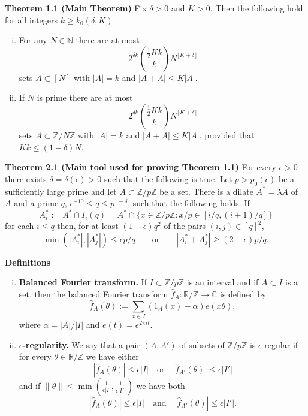 \documentclass[12pt]{article}
\theoremstyle{definition}
\newcommand{\naturals}{\mathbb{N}}
\newcommand{\integers}{\mathbb{Z}}
\newcommand{\complex}{\mathbb{C}}
\newcommand{\reals}{\mathbb{R}}
\begin{document}

\noindent \textbf{Theorem 1.1 (Main Theorem)}
Fix $\delta>0$ and $K>0$. Then the following hold for all integers $k \geq k_0(\delta, K)$.
\begin{enumerate}[(i)]
	\item For any $N\in \naturals$ there are at most
	\[
		2^{\delta k}\binom{\frac{1}{2}Kk}{k}N^{\lfloor K+\delta\rfloor}
	\]
	sets $A\subset [N]$ with $|A| = k$ and $|A+A|\leq K|A|$.

	\item If $N$ is prime there are at most
	\[
		2^{\delta k}\binom{\frac{1}{2}Kk}{k}N^{\lfloor K+\delta \rfloor}
	\]
	sets $A\subset \integers/N\integers$ with $|A|=k$ and $|A+A|\leq K|A|$, provided that $Kk\leq (1-\delta)N$.
\end{enumerate}

\vfill

\noindent \textbf{Theorem 2.1 (Main tool used for proving Theorem 1.1)}
For every $\epsilon>0$ there exists $\delta = \delta(\epsilon) > 0$ such that the following is true.
Let $p > p_0(\epsilon)$ be a sufficiently large prime and let $A \subset \integers/p\integers$ be a set.
There is a dilate $A^* = \lambda A$ of $A$ and a prime $q$, $\epsilon^{-10} \leq q \leq p^{1-\delta}$, such that the following holds. If
\[
A^*_i := A^*\cap I_i(q) = A^*\cap \{x\in \integers/p\integers: x/p\in [i/q, (i+1)/q]\}
\]
for each $i\leq q$ then, for at least $(1-\epsilon)q^2$ of the pairs $(i,j)\in [q]^2$,
\[
\min(|A^*_i|, |A^*_j|)\leq \epsilon p/q \qquad \text{or}\qquad |A^*_i+A^*_j|\geq (2-\epsilon)p/q.
\]

\vfill

\noindent\textbf{Definitions}
\begin{enumerate}[(i)]
	\item \textbf{Balanced Fourier transform.} If $I\subset \integers/p\integers$ is an interval and if $A\subset I$ is a set, then the balanced Fourier transform $\hat{f}_A:\reals/\integers\to \complex$ is defined by
	\[
		\hat{f}_A(\theta):= \sum_{x\in I}(1_A(x)-\alpha)e(x\theta),
	\]
	where $\alpha = |A|/|I|$ and $e(t) = e^{2\pi i t}$.

	\item \textbf{$\epsilon$-regularity.} We say that a pair $(A, A')$ of subsets of $\integers/p\integers$ is $\epsilon$-regular if for every $\theta \in \reals/\integers$ we have either
	\[
		|\hat{f}_A(\theta)|\leq \epsilon|I|\quad \text{or}\quad |\hat{f}_{A'}(\theta)|\leq \epsilon|I'|
	\]
	and if $\|\theta\|\leq \min(\frac{1}{\epsilon |I|}, \frac{1}{\epsilon|I'|})$ we have both
	\[
		|\hat{f}_A(\theta)|\leq \epsilon |I| \quad\text{and}\quad |\hat{f}_{A'}(\theta)|\leq \epsilon|I'|.
	\]
\end{enumerate}
\end{document}
